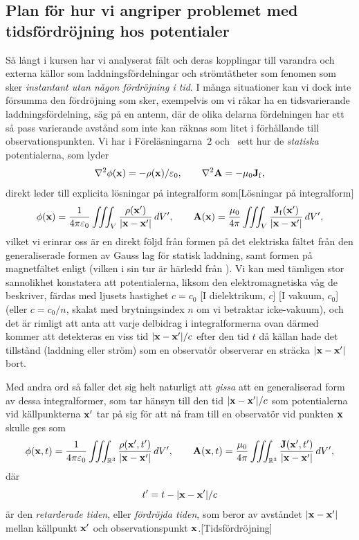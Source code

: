 {{{{{{\subsection{Plan f{\"o}r hur vi angriper problemet med tidsf{\"o}rdr{\"o}jning
  hos potentialer}
S{\aa} l{\aa}ngt i kursen har vi analyserat f{\"a}lt och deras kopplingar till
varandra och externa k{\"a}llor som laddningsf{\"o}rdelningar och
str{\"o}mt{\"a}theter som fenomen som sker {\it instantant utan n{\aa}gon
f{\"o}rdr{\"o}jning i tid}. I m{\aa}nga situationer kan vi dock inte
f{\"o}rsumma den f{\"o}rdr{\"o}jning som sker, exempelvis om vi r{\aa}kar ha
en tidsvarierande laddningsf{\"o}rdelning, s{\"a}g p{\aa} en antenn, d{\"a}r
de olika delarna f{\"o}rdelningen har ett s{\aa} pass varierande avst{\aa}nd
som inte kan r{\"a}knas som litet i f{\"o}rh{\aa}llande till
observa\-tions\-punkten.
Vi har i F{\"o}rel{\"a}sningarna~2 och~ sett hur de {\it statiska} potentialerna,
som lyder 
$$
  \nabla^2\phi({\bf x})=-\rho({\bf x})/\varepsilon_0,\qquad
  \nabla^2{\bf A}=-\mu_0{\bf J}_{\rm f},
$$
direkt leder till explicita l{\"o}sningar p{\aa} integralform som[L{\"o}sningar p{\aa} integralform]
$$
  \phi({\bf x})={{1}\over{4\pi\varepsilon_0}}\iiint_V
    {{\rho({\bf x}')}\over{|{\bf x}-{\bf x}'|}}\,dV',\qquad
  {\bf A}({\bf x})={{\mu_0}\over{4\pi}}\iiint_V
    {{{\bf J}_{\rm f}({\bf x}')}\over{|{\bf x}-{\bf x}'|}}\,dV',
$$
vilket vi erinrar oss {\"a}r en direkt f{\"o}ljd fr{\aa}n formen p{\aa} det
elektriska f{\"a}ltet fr{\aa}n den generaliserade formen av Gauss lag f{\"o}r
statisk laddning, samt formen p{\aa} magnetf{\"a}ltet enligt 
(vilken i sin tur {\"a}r h{\"a}rledd fr{\aa}n ).
Vi kan med t{\"a}mligen stor sannolikhet konstatera att potentialerna, liksom den
elektromagnetiska v{\aa}g de beskriver, f{\"a}rdas med ljusets hastighet $c=c_0$
[I dielektrikum, $c$] [I vakuum, $c_0$]
(eller $c=c_0/n$, skalat med brytningsindex $n$  om vi
betraktar icke-vakuum), och det {\"a}r rimligt att anta att varje delbidrag i
integralformerna ovan d{\"a}rmed kommer att detekteras en viss tid
$|{\bf x}-{\bf x}'|/c$ efter den tid $t$ d{\aa} k{\"a}llan hade det
tillst{\aa}nd (laddning eller str{\"o}m) som en observat{\"o}r observerar
en str{\"a}cka $|{\bf x}-{\bf x}'|$ bort.

Med andra ord s{\aa} faller det sig helt naturligt att {\it gissa} att en
generaliserad form av dessa integralformer, som tar h{\"a}nsyn till den tid
$|{\bf x}-{\bf x}'|/c$ som potentialerna vid k{\"a}llpunkterna ${\bf x}'$ tar
p{\aa} sig f{\"o}r att n{\aa} fram till en observat{\"o}r vid punkten ${\bf x}$
skulle ges som
$$
  \phi({\bf x},t)={{1}\over{4\pi\varepsilon_0}}\iiint_{{\Bbb R}^3}
    {{\rho({\bf x}',t')}\over{|{\bf x}-{\bf x}'|}}\,dV',\qquad
  {\bf A}({\bf x},t)={{\mu_0}\over{4\pi}}\iiint_{{\Bbb R}^3}
    {{{\bf J}({\bf x}',t')}\over{|{\bf x}-{\bf x}'|}}\,dV',
$$
d{\"a}r
$$
  t' = t - |{\bf x}-{\bf x}'|/c
$$
{\"a}r den {\it retarderade tiden}, eller {\it f{\"o}rdr{\"o}jda tiden}, som
beror av avst{\aa}ndet $|{\bf x}-{\bf x}'|$ mellan k{\"a}llpunkt ${\bf x}'$ och
observationspunkt ${\bf x}$.[Tidsf{\"o}rdr{\"o}jning]

}}}}}}
